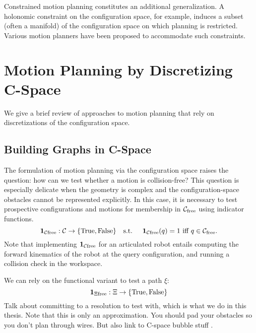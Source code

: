 Constrained motion planning constitutes an additional generalization.
A holonomic constraint on the configuration space,
for example,
induces a subset (often a manifold) of the configuration space
on which planning is restricted.
Various motion planners \citep{berenson2009manifolds}
have been proposed to accommodate such constraints.

\section{Motion Planning by Discretizing C-Space}

We give a brief review of approaches to motion planning that rely
on discretizations of the configuration space.

\subsection{Building Graphs in C-Space}
\label{subsec:roadmaps:building-graphs}

The formulation of motion planning via the configuration space
raises the question:
how can we test whether a motion is collision-free?
This question is especially delicate when the geometry is complex
and the configuration-space obstacles cannot be represented explicitly.
In this case,
it is necessary to test prospective configurations and motions
for membership in $\mathcal{C}_{\mbox{\scriptsize free}}$ using indicator functions.
\begin{equation}
   \mathbf{1}_{\mathcal{C}\mbox{\scriptsize free}} : \mathcal{C} \rightarrow \{ \mbox{True}, \mbox{False} \} 
   \mbox{\quad s.t. \quad}
   \mathbf{1}_{\mathcal{C}\mbox{\scriptsize free}}(q) = 1 \mbox{ iff } q \in \mathcal{C}_{\mbox{\scriptsize free}}.
\end{equation}
Note that implementing $\mathbf{1}_{\mathcal{C}\mbox{\scriptsize free}}$ for an articulated robot
entails computing the forward kinematics of the robot at the
query configuration,
and running a collision check in the workspace.

We can rely on the functional variant to test a path $\xi$:
\begin{equation}
   \mathbf{1}_{\Xi\mbox{\scriptsize free}} : \Xi \rightarrow
      \{ \mbox{True}, \mbox{False} \} 
\end{equation}
Talk about committing to a resolution to test with,
which is what we do in this thesis.
Note that this is only an approximation.
You should pad your obstacles so you don't plan through wires.
But also link to C-space bubble stuff
\citep{quinlan1994modification}.

